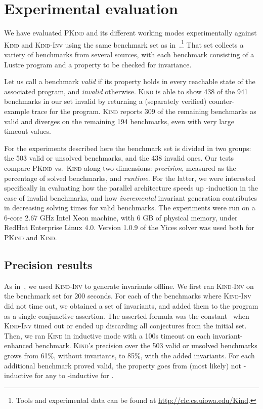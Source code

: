 \documentclass[submission,copyright,creativecommons]{eptcs}
\newcommand{\define}[1]{\emph{#1}}
\newcommand{\Kind}{\textrm{\textsc{Kind}}\xspace}
\newcommand{\KindInv}{\textrm{\textsc{Kind}-\textsc{Inv}}\xspace}
\newcommand{\PKind}{\textrm{\textsc{PKind}}\xspace}
\begin{document}
\vspace{-0.4cm}
\section{Experimental evaluation}

We have evaluated \PKind and its different working modes experimentally
against \Kind and \KindInv
using the same benchmark set as in~\cite{Kahsai-Ge-Tinelli-10}.\footnote{ Tools and experimental data can be found at
  \url{http://clc.cs.uiowa.edu/Kind}.} 
That set collects a variety of benchmarks from several sources,
with each benchmark consisting of a Lustre program 
and a property to be checked for invariance.


Let us call a benchmark \emph{valid} if its property holds 
in every reachable state of the associated program, 
and \define{invalid} otherwise. \Kind is able
to show 438 of the 941 benchmarks in our set invalid by
returning a (separately verified) counter-example trace for the
program.  \Kind reports 309 of the remaining benchmarks as valid and
diverges on the remaining 194 benchmarks, even with very large timeout
values. 


For the experiments described here the benchmark set is divided in two
groups: the 503 valid or unsolved benchmarks, and the 438
invalid ones.  Our tests compare \PKind vs.~\Kind
along two dimensions: \emph{precision}, measured as the percentage of solved
benchmarks, and \emph{runtime}.  For the latter, we were interested
specifically in evaluating how the parallel architecture speeds up
-induction in the case of invalid benchmarks, and how
\emph{incremental} invariant generation contributes in decreasing
solving times for valid benchmarks. The experiments were run on a
6-core 2.67 GHz Intel Xeon machine, with 6 GB of physical memory,
under RedHat Enterprise Linux 4.0.  Version 1.0.9 of the Yices solver
was used both for \PKind and \Kind.


\subsection{Precision results}

As in~\cite{Kahsai-Ge-Tinelli-10}, we used \KindInv to generate
invariants offline.  We first ran \KindInv on
the benchmark set for 200 seconds.  For each of the benchmarks where
\KindInv did not time out, we obtained a set of invariants, and added
them to the program as a single conjunctive assertion.  The asserted
formula was the constant \true\ when \KindInv timed out or ended up
discarding all conjectures from the initial set.  Then, we
ran \Kind in inductive mode with a 100s timeout on each
invariant-enhanced benchmark.  
\Kind's precision over the 503 valid or unsolved benchmarks 
grows from 61\%, without invariants, to 85\%, with the added invariants.  
For each additional benchmark proved valid, 
the property goes from (most likely) not -inductive for any  
to -inductive for .
\end{document}

